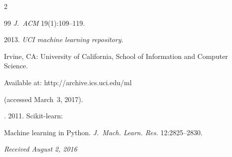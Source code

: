\begin{multicols}{2}
{{\begin{thebibliography}{99}
\textit{J.~ACM} 19(1):109--119.












 2013. \textit{UCI machine learning repository}. 


Irvine, CA: University of California, School of Information and Computer Science.


Available at: {\sf http://archive.ics.uci.edu/ml}


(accessed March~3, 2017). 







. 2011. Scikit-learn: 


Machine learning in Python. \textit{J.~Mach. Learn. Res.} 12:2825--2830.


\end{thebibliography}





 }


 }





\end{multicols}





\vspace*{-3pt}





\hfill{\small\textit{Received August 2, 2016}}





\Contr





\noindent


